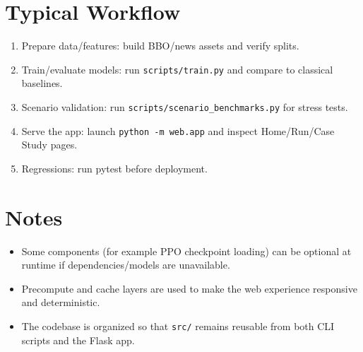 \documentclass[11pt]{article}
\begin{document}
\section{Typical Workflow}
\begin{enumerate}[leftmargin=1.4em]
    \item Prepare data/features: build BBO/news assets and verify splits.
    \item Train/evaluate models: run \texttt{scripts/train.py} and compare to classical baselines.
    \item Scenario validation: run \texttt{scripts/scenario\_benchmarks.py} for stress tests.
    \item Serve the app: launch \texttt{python -m web.app} and inspect Home/Run/Case Study pages.
    \item Regressions: run pytest before deployment.
\end{enumerate}

\section{Notes}
\begin{itemize}[leftmargin=1.2em]
    \item Some components (for example PPO checkpoint loading) can be optional at runtime if dependencies/models are unavailable.
    \item Precompute and cache layers are used to make the web experience responsive and deterministic.
    \item The codebase is organized so that \texttt{src/} remains reusable from both CLI scripts and the Flask app.
\end{itemize}
\end{document}
